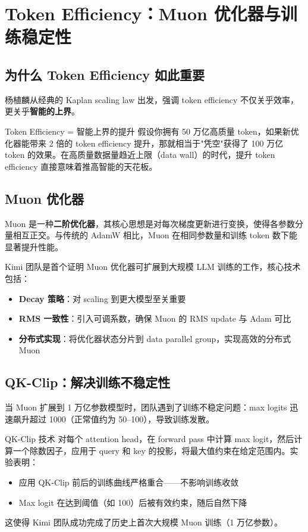 \section{Token Efficiency：Muon 优化器与训练稳定性}

\subsection{为什么 Token Efficiency 如此重要}

杨植麟从经典的 Kaplan scaling law 出发，强调 token efficiency 不仅关乎效率，更关乎\textbf{智能的上界}。

\begin{importantbox}{Token Efficiency = 智能上界的提升}
假设你拥有 50 万亿高质量 token，如果新优化器能带来 2 倍的 token efficiency 提升，那就相当于"凭空"获得了 100 万亿 token 的效果。在高质量数据量趋近上限（data wall）的时代，提升 token efficiency 直接意味着推高智能的天花板。
\end{importantbox}

\subsection{Muon 优化器}

Muon 是一种\textbf{二阶优化器}，其核心思想是对每次梯度更新进行变换，使得各参数分量相互正交。与传统的 AdamW 相比，Muon 在相同参数量和训练 token 数下能显著提升性能。

Kimi 团队是首个证明 Muon 优化器可扩展到大规模 LLM 训练的工作，核心技术包括：
\begin{itemize}
    \item \textbf{Decay 策略}：对 scaling 到更大模型至关重要
    \item \textbf{RMS 一致性}：引入可调系数，确保 Muon 的 RMS update 与 Adam 可比
    \item \textbf{分布式实现}：将优化器状态分片到 data parallel group，实现高效的分布式 Muon
\end{itemize}

\subsection{QK-Clip：解决训练不稳定性}

当 Muon 扩展到 1 万亿参数模型时，团队遇到了训练不稳定问题：max logits 迅速飙升超过 1000（正常值约为 50--100），导致训练发散。

\begin{importantbox}{QK-Clip 技术}
对每个 attention head，在 forward pass 中计算 max logit，然后计算一个除数因子，应用于 query 和 key 的投影，将最大值约束在给定范围内。实验表明：
\begin{itemize}
    \item 应用 QK-Clip 前后的训练曲线严格重合——不影响训练收敛
    \item Max logit 在达到阈值（如 100）后被有效约束，随后自然下降
\end{itemize}
这使得 Kimi 团队成功完成了历史上首次大规模 Muon 训练（1 万亿参数）。
\end{importantbox}

